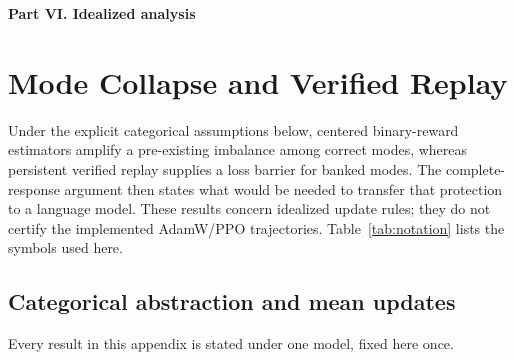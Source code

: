\documentclass{article}
\newcommand{\1}{\mathbf 1}
\theoremstyle{remark}
\theoremstyle{definition}
\theoremstyle{plain}
\begin{document}




\clearpage
{}
\begin{center}\large\textbf{Part VI. Idealized analysis}\end{center}

\section{Mode Collapse and Verified Replay}
\label{app:theory}

Under the explicit categorical assumptions below, centered binary-reward
estimators amplify a pre-existing imbalance among correct modes,
whereas persistent verified replay supplies a loss barrier for banked modes.
The complete-response argument then states what would be needed to transfer
that protection to a language model. These results concern idealized update
rules; they do not certify the implemented AdamW/PPO trajectories.
Table~\ref{tab:notation} lists the symbols used here.

\subsection{Categorical abstraction and mean updates}
\label{app:theory-grpo-mean}

Every result in this appendix is stated under one model, fixed here once.
\end{document}
